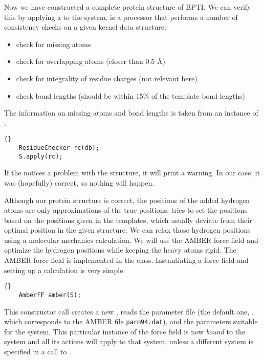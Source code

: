 \noindent
Now we have constructed a complete protein structure of BPTI. We can verify
this by applying a  to the system.
 is a processor that performs a number of consistency
checks on a given kernel data structure:
\begin{itemize}
	\item check for missing atoms
	\item check for overlapping atoms (closer than 0.5 \AA)
	\item check for integrality of residue charges (not relevant here)
	\item check bond lengths (should be within 15\% of the template bond lengths)
\end{itemize}
The information on missing atoms and bond lengths is taken from an instance
of :

\begin{lstlisting}{}
	ResidueChecker rc(db);
	S.apply(rc);
\end{lstlisting}
	
\noindent
If the  notices a problem with the structure, it will 
print a warning. In our case, it was (hopefully) correct, so nothing will
happen.

Although our protein structure is correct, the positions of the added hydrogen
atoms are only approximations of the true positions.
 tries to set the positions based on the
positions given in the  templates, which usually deviate
from their optimal position in the given structure. We can relax those
hydrogen positions using a molecular mechanics calculation.
We will use the AMBER force field\cite{AMBER95} and optimize the hydrogen 
positions while keeping the heavy atoms rigid. The AMBER force field is
implemented in the  class. Instantiating a force field and
setting up a calculation is very simple:

\begin{lstlisting}{}
	AmberFF amber(S);
\end{lstlisting}

\noindent
This constructor call creates a new , reads the parameter
file (the default one, , which corresponds to the AMBER
file {\tt parm94.dat}), and the parameters suitable for the system.
This particular instance of the force field is now {\em bound} to the 
system and all its actions will apply to that system, unless a different
system is specified in a call to .

